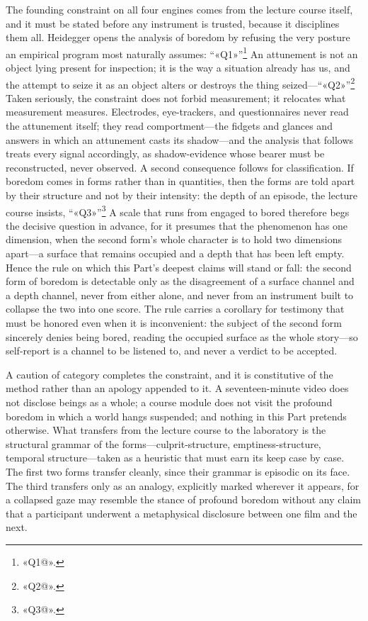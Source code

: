 The founding constraint on all four engines comes from the lecture course itself, and it must be stated before any instrument is trusted, because it disciplines them all. Heidegger opens the analysis of boredom by refusing the very posture an empirical program most naturally assumes: ``«Q1»''\footnote{«Q1@».} An attunement is not an object lying present for inspection; it is the way a situation already has us, and the attempt to seize it as an object alters or destroys the thing seized---``«Q2»''\footnote{«Q2@».} Taken seriously, the constraint does not forbid measurement; it relocates what measurement measures. Electrodes, eye-trackers, and questionnaires never read the attunement itself; they read comportment---the fidgets and glances and answers in which an attunement casts its shadow---and the analysis that follows treats every signal accordingly, as shadow-evidence whose bearer must be reconstructed, never observed. A second consequence follows for classification. If boredom comes in forms rather than in quantities, then the forms are told apart by their structure and not by their intensity: the depth of an episode, the lecture course insists, ``«Q3»''\footnote{«Q3@».} A scale that runs from engaged to bored therefore begs the decisive question in advance, for it presumes that the phenomenon has one dimension, when the second form's whole character is to hold two dimensions apart---a surface that remains occupied and a depth that has been left empty. Hence the rule on which this Part's deepest claims will stand or fall: the second form of boredom is detectable only as the disagreement of a surface channel and a depth channel, never from either alone, and never from an instrument built to collapse the two into one score. The rule carries a corollary for testimony that must be honored even when it is inconvenient: the subject of the second form sincerely denies being bored, reading the occupied surface as the whole story---so self-report is a channel to be listened to, and never a verdict to be accepted.

A caution of category completes the constraint, and it is constitutive of the method rather than an apology appended to it. A seventeen-minute video does not disclose beings as a whole; a course module does not visit the profound boredom in which a world hangs suspended; and nothing in this Part pretends otherwise. What transfers from the lecture course to the laboratory is the structural grammar of the forms---culprit-structure, emptiness-structure, temporal structure---taken as a heuristic that must earn its keep case by case. The first two forms transfer cleanly, since their grammar is episodic on its face. The third transfers only as an analogy, explicitly marked wherever it appears, for a collapsed gaze may resemble the stance of profound boredom without any claim that a participant underwent a metaphysical disclosure between one film and the next.

